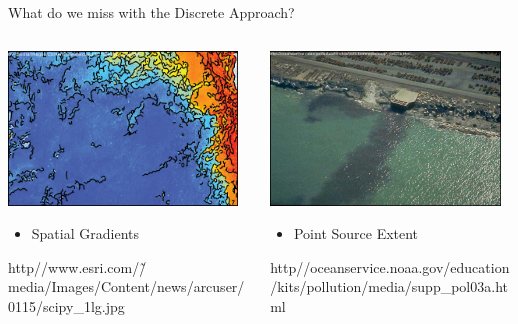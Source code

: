 \documentclass[compress,noflama,nosectionpages]{beamer}
\begin{document}
\begin{frame}{What do we miss with the Discrete Approach?}
\vspace{8pt}
	\begin{columns}
		\begin{column}[c]{6cm}
	  	\includegraphics[height=4.1cm,clip=true,trim = 0mm 0mm 0mm 0mm,keepaspectratio=true]{images/scipy_border.png}%
	  	\vspace{3pt}
	  	\begin{itemize}
	  		\item{Spatial Gradients}
	  	\end{itemize}
	  	\vspace{25pt}
	  	{\fontsize{3pt}{3pt}\selectfont http\://www.esri.com/\~/media/Images/Content/news/arcuser/0115/scipy\_1\-lg.jpg}\normalsize
		\end{column}
		\begin{column}[c]{6cm}
			\includegraphics[height=4.1cm,keepaspectratio=true]{images/pointsource_border.png}%
			\vspace{3pt}
			\begin{itemize}
	  		\item{Point Source Extent}
	  	\end{itemize}
	  	\vspace{25pt}
	  	{\fontsize{3pt}{3pt}\selectfont http\://oceanservice.noaa.gov/education/kits/pollution/media/supp\_pol03a.html}\normalsize
		\end{column}
	\end{columns}
     
\end{frame}
\end{document}
